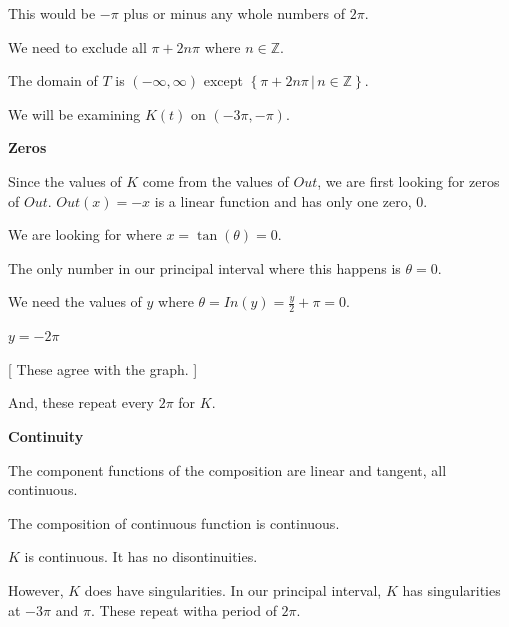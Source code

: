 \documentclass{ximera}
\begin{document}
This would be $-\pi$ plus or minus any whole numbers of $2\pi$.

We need to exclude  all $\pi + 2n\pi$ where $n \in \mathbb{Z}$. 




The domain of $T$ is $(-\infty, \infty)$ except $\left\{  \pi + 2n\pi \, | \,   n \in \mathbb{Z}  \right\}$. 




We will be examining $K(t)$ on $(-3\pi, -\pi)$. 














\textbf{\textcolor{blue!55!black}{Zeros}}


Since the values of $K$ come from the values of $Out$, we are first looking for zeros of $Out$.  $Out(x) = -x$ is a linear function and has only one zero, $0$. 

We are looking for where $x = \tan(\theta) = 0$. 


The only number in our principal interval where this happens is $\theta = 0$. 



We need the values of $y$ where $\theta = In(y) = \frac{y}{2} + \pi = 0$. 


$y = -2\pi$  

[ These agree with the graph. ]


And, these repeat every $2\pi$ for $K$.




















\textbf{\textcolor{blue!55!black}{Continuity}}


The component functions of the composition are linear and tangent, all continuous. 

The composition of continuous function is continuous.

$K$ is continuous. It has no disontinuities. 


However, $K$ does have singularities. In our principal interval, $K$ has singularities at $-3\pi$ and $\pi$.  These repeat witha period of $2\pi$.
\end{document}
